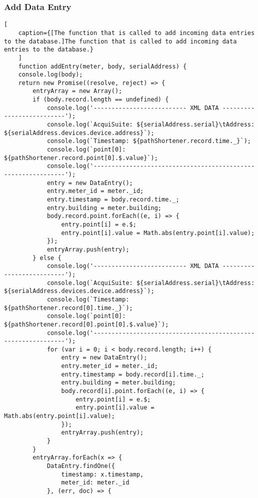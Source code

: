 \subsubsection{Add Data Entry}
\label{sec:addEntry}
\begin{lstlisting}[
    caption={[The function that is called to add incoming data entries to the database.]The function that is called to add incoming data entries to the database.}
    ]
    function addEntry(meter, body, serialAddress) {
    console.log(body);
    return new Promise((resolve, reject) => {
        entryArray = new Array();
        if (body.record.length == undefined) {
            console.log('-------------------------- XML DATA --------------------------');
            console.log(`AcquiSuite: ${serialAddress.serial}\tAddress: ${serialAddress.devices.device.address}`);
            console.log(`Timestamp: ${pathShortener.record.time._}`);
            console.log(`point[0]: ${pathShortener.record.point[0].$.value}`);
            console.log('--------------------------------------------------------------');
            entry = new DataEntry();
            entry.meter_id = meter._id;
            entry.timestamp = body.record.time._;
            entry.building = meter.building;
            body.record.point.forEach((e, i) => {
                entry.point[i] = e.$;
                entry.point[i].value = Math.abs(entry.point[i].value);
            });
            entryArray.push(entry);
        } else {
            console.log('-------------------------- XML DATA --------------------------');
            console.log(`AcquiSuite: ${serialAddress.serial}\tAddress: ${serialAddress.devices.device.address}`);
            console.log(`Timestamp: ${pathShortener.record[0].time._}`);
            console.log(`point[0]: ${pathShortener.record[0].point[0].$.value}`);
            console.log('--------------------------------------------------------------');
            for (var i = 0; i < body.record.length; i++) {
                entry = new DataEntry();
                entry.meter_id = meter._id;
                entry.timestamp = body.record[i].time._;
                entry.building = meter.building;
                body.record[i].point.forEach((e, i) => {
                    entry.point[i] = e.$;
                    entry.point[i].value = Math.abs(entry.point[i].value);
                });
                entryArray.push(entry);
            }
        }
        entryArray.forEach(x => {
            DataEntry.findOne({
                timestamp: x.timestamp,
                meter_id: meter._id
            }, (err, doc) => {

\end{lstlisting}
